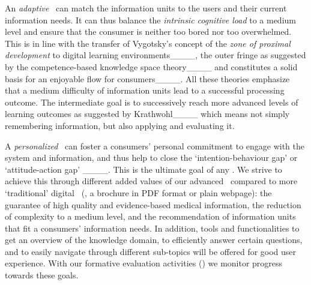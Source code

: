An \emph{adaptive} \chis\ can match the information units to the users and their current information needs. 
%
It can thus balance the \emph{intrinsic cognitive load} to a medium level and ensure that the consumer is neither too bored nor too overwhelmed. 
%
This is in line with the transfer of Vygotsky’s concept of the \emph{zone of proximal development} to digital learning environments____, the outer fringe as suggested by the competence-based knowledge space theory____ and constitutes a solid basis for an enjoyable flow for consumers____. 
%
All these theories emphasize that a medium difficulty of information units lead to a successful processing outcome. The intermediate goal is to successively reach more advanced levels of learning outcomes as suggested by Krathwohl____ which means not simply remembering information, but also applying and evaluating it.


A \emph{personalized} \chis\ can foster a consumers’ personal commitment to engage with the system and information, and thus help to close the `intention-behaviour gap’ or `attitude-action gap' ____. 
%
This is the ultimate goal of any \chis. 
%
We strive to achieve this through different added values of our advanced \chis\ compared to more `traditional’ digital \chis\ (\eg, a brochure in PDF format or plain webpage): the guarantee of high quality and evidence-based medical information, the reduction of complexity to a medium level, and the recommendation of information units that fit a consumers’ information needs. 
%
In addition, tools and functionalities to get an overview of the knowledge domain, to efficiently answer certain questions, and to easily navigate through different sub-topics will be offered for good user experience. With our formative evaluation activities () we monitor progress towards these goals.






